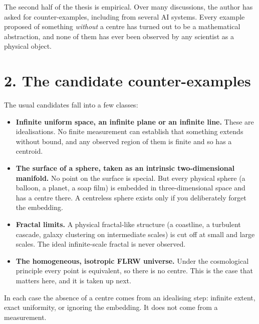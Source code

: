 \documentclass[11pt,a4paper]{article}
\begin{document}
The second half of the thesis is empirical. Over many discussions, the author has asked for counter-examples, including from several AI systems. Every example proposed of something \emph{without} a centre has turned out to be a mathematical abstraction, and none of them has ever been observed by any scientist as a physical object.
\section*{2. The candidate counter-examples}
The usual candidates fall into a few classes:
\begin{itemize}
\item \textbf{Infinite uniform space, an infinite plane or an infinite line.} These are idealisations. No finite measurement can establish that something extends without bound, and any observed region of them is finite and so has a centroid.
\item \textbf{The surface of a sphere, taken as an intrinsic two-dimensional manifold.} No point on the surface is special. But every physical sphere (a balloon, a planet, a soap film) is embedded in three-dimensional space and has a centre there. A centreless sphere exists only if you deliberately forget the embedding.
\item \textbf{Fractal limits.} A physical fractal-like structure (a coastline, a turbulent cascade, galaxy clustering on intermediate scales) is cut off at small and large scales. The ideal infinite-scale fractal is never observed.
\item \textbf{The homogeneous, isotropic FLRW universe.} Under the cosmological principle every point is equivalent, so there is no centre. This is the case that matters here, and it is taken up next.
\end{itemize}
In each case the absence of a centre comes from an idealising step: infinite extent, exact uniformity, or ignoring the embedding. It does not come from a measurement.
\end{document}
